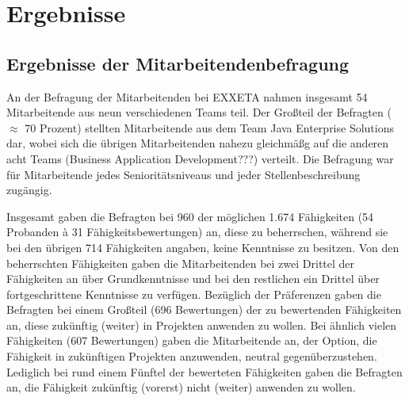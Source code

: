 
\chapter{Ergebnisse}
\label{ch:ergebnisse}

\section{Ergebnisse der Mitarbeitendenbefragung}
An der Befragung der Mitarbeitenden bei EXXETA nahmen insgesamt 54 Mitarbeitende aus neun verschiedenen Teams teil.
Der Großteil der Befragten ($\approx$ 70 Prozent) stellten Mitarbeitende aus dem Team Java Enterprise Solutions dar, wobei sich die übrigen Mitarbeitenden nahezu gleichmäßg auf die anderen acht Teams (Business Application Development???) verteilt.
Die Befragung war für Mitarbeitende jedes Senioritätsniveaus und jeder Stellenbeschreibung zugängig.


Insgesamt gaben die Befragten bei 960 der möglichen 1.674 Fähigkeiten (54 Probanden \`{a} 31 Fähigkeitsbewertungen) an, diese zu beherrschen, während sie bei den übrigen 714 Fähigkeiten angaben, keine Kenntnisse zu besitzen.
Von den beherrschten Fähigkeiten gaben die Mitarbeitenden bei zwei Drittel der Fähigkeiten an über Grundkenntnisse und bei den restlichen ein Drittel über fortgeschrittene Kenntnisse zu verfügen.
Bezüglich der Präferenzen gaben die Befragten bei einem Großteil (696 Bewertungen) der zu bewertenden Fähigkeiten an, diese zukünftig (weiter) in Projekten anwenden zu wollen.
Bei ähnlich vielen Fähigkeiten (607 Bewertungen) gaben die Mitarbeitende an, der Option, die Fähigkeit in zukünftigen Projekten anzuwenden, neutral gegenüberzustehen.
Lediglich bei rund einem Fünftel der bewerteten Fähigkeiten gaben die Befragten an, die Fähigkeit zukünftig (vorerst) nicht (weiter) anwenden zu wollen.

